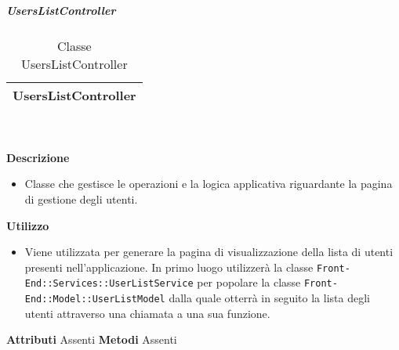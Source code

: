 			\subparagraph{UsersListController} 
\begin{table}[ht]
\begin{center}
\bgroup
	\setlength{\arrayrulewidth}{0.6mm}
	\def\arraystretch{1}
		\begin{tabular}{ | p{12cm} | }
				\hline  
					\centerline{\textbf{UsersListController}}
		\\ \hline 
				\hline
				\hline
		
		\end{tabular}
\egroup
\caption{Classe UsersListController}
\end{center}
\end{table} \textbf{\\ \\ Descrizione}
\begin{itemize}
\item[] Classe che gestisce le operazioni e la logica applicativa riguardante la pagina di gestione degli utenti.
\end{itemize} 
\textbf{Utilizzo}
\begin{itemize}
\item[] Viene utilizzata per generare la pagina di visualizzazione della lista di utenti presenti nell'applicazione. In primo luogo utilizzerà la classe \texttt{Front-End::Services::UserListService} per popolare la classe \texttt{Front-End::Model::UserListModel} dalla quale otterrà in seguito la lista degli utenti attraverso una chiamata a una sua funzione.
\end{itemize}
\textbf{Attributi}
Assenti
\textbf{Metodi}
Assenti


